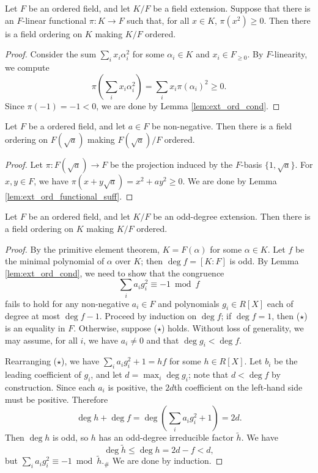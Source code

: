 \begin{lemma}
  \label{lem:ext_ord_functional_suff}
  Let $F$ be an ordered field, and let $K/F$ be a field extension. Suppose that there is an $F$-linear functional $\pi:K\to F$ such that, for all $x\in K$, $\pi(x^2)\geq0$. Then there is a field ordering on $K$ making $K/F$ ordered.
\end{lemma}
\begin{proof}
  Consider the sum $\sum_i x_i\alpha_i^2$ for some $\alpha_i\in K$ and $x_i\in F_{\geq0}$. By $F$-linearity, we compute
  \[\pi(\sum_i x_i\alpha_i^2)=\sum_i x_i\pi(\alpha_i)^2\geq0.\]
  Since $\pi(-1)=-1<0$, we are done by Lemma \ref{lem:ext_ord_cond}.
\end{proof}

\begin{corollary}
  \label{cor:ext_ord_to_adj_sqrt}
  Let $F$ be a ordered field, and let $a\in F$ be non-negative. Then there is a field ordering on $F(\sqrt{a})$ making $F(\sqrt{a})/F$ ordered.
\end{corollary}
\begin{proof}
  Let $\pi:F(\sqrt{a})\to F$ be the projection induced by the $F$-basis $\{1,\sqrt{a}\}$. For $x,y\in F$, we have $\pi(x+y\sqrt{a})=x^2+ay^2\geq0$. We are done by Lemma \ref{lem:ext_ord_functional_suff}.
\end{proof}

\begin{lemma}
  \label{lem:odd_deg_real}
  Let $F$ be an ordered field, and let $K/F$ be an odd-degree extension. Then there is a field ordering on $K$ making $K/F$ ordered.
\end{lemma}
\begin{proof}
  By the primitive element theorem, $K=F(\alpha)$ for some $\alpha\in K$. Let $f$ be the minimal polynomial of $\alpha$ over $K$; then $\deg f=[K:F]$ is odd. By Lemma \ref{lem:ext_ord_cond}, we need to show that the congruence
  \[\sum_ia_ig_i^2\equiv-1\bmod f\tag{\star}\]
  fails to hold for any non-negative $a_i\in F$ and polynomials $g_i\in R[X]$ each of degree at most $\deg f-1$. Proceed by induction on $\deg f$; if $\deg f=1$, then ($\star$) is an equality in $F$. Otherwise, suppose ($\star$) holds. Without loss of generality, we may assume, for all $i$, we have $a_i\neq0$ and that $\deg g_i<\deg f$.
  
  Rearranging ($\star$), we have $\sum_ia_ig_i^2+1=hf$ for some $h\in R[X]$. Let $b_i$ be the leading coefficient of $g_i$, and let $d=\max_i\deg g_i$; note that $d<\deg f$ by construction. Since each $a_i$ is positive, the $2d$th coefficient on the left-hand side must be positive. Therefore
  \[\deg h+\deg f=\deg(\sum_ia_ig_i^2+1)=2d.\]
  Then $\deg h$ is odd, so $h$ has an odd-degree irreducible factor $\tilde h$. We have
  \[\deg\tilde h\leq\deg h=2d-f<d,\]
  but $\sum_ia_ig_i^2\equiv-1\bmod\tilde h$.$_\#$ We are done by induction.
\end{proof}

